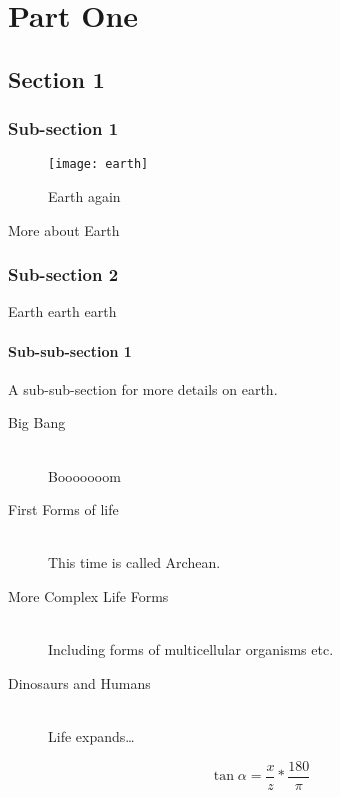 
\chapter{Part One}


\section{Section 1}

\subsection{Sub-section 1}
\begin{wrapfigure}{R}{0.45\textwidth}
  \begin{center}
    \texttt{[image: earth]}
  \end{center}
  \caption{Earth again}
\end{wrapfigure}

More about Earth

\subsection{Sub-section 2}
Earth earth earth

\subsubsection{Sub-sub-section 1}

A sub-sub-section for more details on earth.

\begin{description}
\item[Big Bang] \hfill \\
Booooooom

\item[First Forms of life] \hfill \\
This time is called Archean.

\item[More Complex Life Forms] \hfill \\
Including forms of multicellular organisms etc.

\item[Dinosaurs and Humans] \hfill \\
Life expands\ldots
\end{description} 

\begin{equation}
\tan\alpha = \frac{x}{z} * \frac{180}{\pi} 
\end{equation}

